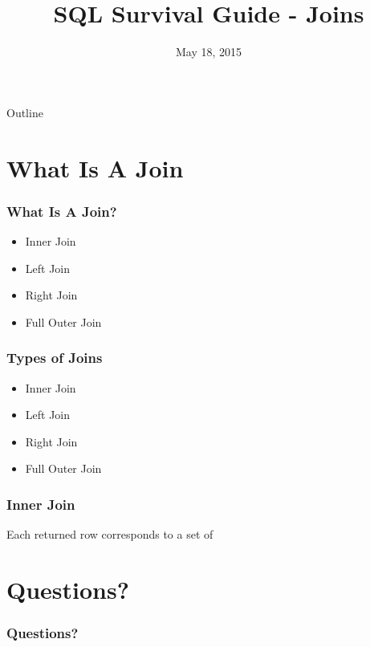 \documentclass{beamer}
\title[SQL Survival Guide - Joins]{SQL Survival Guide - Joins}
\institute{Office of Quality and Patient Safety}
\date{May 18, 2015}
\begin{document}
\begin{frame}
  \titlepage
\end{frame}

\begin{frame}{Outline}
  \tableofcontents
\end{frame}

\section{What Is A Join}

\begin{frame}
  \frametitle{What Is A Join?}
  \pause
  \begin{itemize}
  \item Inner Join
  \item Left Join
  \item Right Join
  \item Full Outer Join
  \end{itemize}
\end{frame}  

\begin{frame}
  \frametitle{Types of Joins}
  \pause
  \begin{itemize}
  \item Inner Join
  \item Left Join
  \item Right Join
  \item Full Outer Join
  \end{itemize}
\end{frame}  

\begin{frame}
  \frametitle{Inner Join}
  
  Each returned row corresponds to a set of
\end{frame}

\section{Questions?}

\begin{frame}
 \frametitle{Questions?}

\end{frame}
\end{document}
